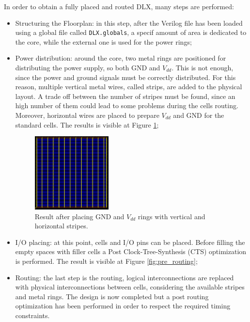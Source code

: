 In order to obtain a fully placed and routed DLX, many steps are performed:
\begin{itemize}
	\item Structuring the Floorplan: in this step, after the Verilog file has been loaded using a global file called \texttt{DLX.globals}, a specif amount of area is dedicated to the core, while the external one is used for the power rings;
	\item Power distribution: around the core, two metal rings are positioned for distributing the power supply, so both GND and $V_{dd}$. This is not enough, since the power and ground signals must be correctly distributed. For this reason, multiple vertical metal wires, called strips, are added to the physical layout. A trade off between the number of stripes must be found, since an high number of them could lead to some problems during the cells routing. Moreover, horizontal wires are placed to prepare $V_{dd}$ and GND for the standard cells. The results is visible at Figure \ref{stripes};
	\begin{figure}[h]   
		\centering
		\includegraphics[width=0.38\textwidth]{chapters/9_PhysicalDesign/images/pwr_distribution.png}
		\caption{Result after placing GND and $V_{dd}$ rings with vertical and horizontal stripes.}
		\label{stripes}
	\end{figure}
	
	\item I/O placing: at this point, cells and I/O pins can be placed. Before filling the empty spaces with filler cells a Post Clock-Tree-Synthesis (CTS) optimization is performed. The result is visible at Figure \ref{fig:pre_routing};
	\item Routing: the last step is the routing, logical interconnections are replaced with physical interconnections between cells, considering the available stripes and metal rings. The design is now completed but a post routing optimization has been performed in order to respect the required timing constraints.
	

	 
\end{itemize}
